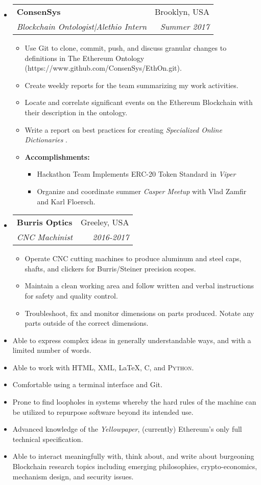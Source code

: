 \documentclass[letterpaper,10pt]{article}
\makeatletter
\newlength{\outerbordwidth}
\newcommand{\resitem}[1]{\item #1 \vspace{-2pt}}
\newcommand{\resheading}[1]{\vspace{8pt}
  \parbox{\textwidth}{\setlength{\FrameSep}{\outerbordwidth}
    \begin{shaded}
\setlength{\fboxsep}{0pt}\framebox[\textwidth][l]{\setlength{\fboxsep}{4pt}\fcolorbox{shadecolorB}{shadecolorB}{\textbf{\sffamily{\mbox{~}\makebox[6.762in][l]{\large #1} \vphantom{p\^{E}}}}}}
    \end{shaded}
  }\vspace{-5pt}
}
\newcommand{\ressubheading}[4]{
\begin{tabular*}{6.5in}{l@{\cftdotfill{\cftsecdotsep}\extracolsep{\fill}}r}
		\textbf{#1} & #2 \\
		\textit{#3} & \textit{#4} \\
\end{tabular*}\vspace{-6pt}}
\makeatother
\begin{document}
\begin{itemize}

	\item \ressubheading{ConsenSys}{Brooklyn, USA}{Blockchain Ontologist|Alethio Intern}{Summer 2017}

\begin{itemize}
	\resitem{Use Git to clone, commit, push, and discuss granular changes to definitions in The Ethereum Ontology (https://www.github.com/ConsenSys/EthOn.git).} 
	\resitem{Create weekly reports for the team summarizing my work activities.}
	\resitem{Locate and correlate significant events on the Ethereum Blockchain with their description in the ontology.}
	\resitem{Write a report on best practices for creating \textit{Specialized Online Dictionaries}}.
	\resitem{\textbf{Accomplishments:}}
		\begin{itemize}
				\resitem{Hackathon Team Implements ERC-20 Token Standard in \textit{Viper}}
				\resitem{Organize and coordinate summer \textit{Casper Meetup} with Vlad Zamfir and Karl Floersch.}
		\end{itemize}
\end{itemize}

\item \ressubheading{Burris Optics}{Greeley, USA}{CNC Machinist}{2016-2017}

	\begin{itemize}
		\resitem{Operate CNC cutting machines to produce aluminum and steel caps, shafts, and clickers for Burris/Steiner precision scopes.}
		\resitem{Maintain a clean working area and follow written and verbal instructions for safety and quality control.}
		\resitem{Troubleshoot, fix and monitor dimensions on parts produced. Notate any parts outside of the correct dimensions.}
	\end{itemize}

\end{itemize}


\resheading{Skills}

\begin{itemize}
	\resitem{Able to express complex ideas in generally understandable ways, and with a limited number of words.}
	\resitem{Able to work with \textsc{HTML}, \textsc{XML}, \LaTeX, \textsc{C}, and \textsc{Python}. }
	\resitem{Comfortable using a terminal interface and Git.}
	\resitem{Prone to find loopholes in systems whereby the hard rules of the machine can be utilized to repurpose software beyond its intended use.}
	\resitem{Advanced knowledge of the \textit{Yellowpaper}, (currently) Ethereum's only full technical specification.}
	\resitem{Able to interact meaningfully with, think about, and write about burgeoning Blockchain research topics including emerging philosophies, crypto-economics, mechanism design, and security issues.}
\end{itemize}
\end{document}

